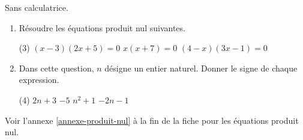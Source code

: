 \documentclass[10pt,a4paper]{article}
\begin{document}
\begin{bloc}
\begin{exo}
Sans calculatrice.
\begin{enumerate}[leftmargin=*]
    \item Résoudre les équations produit nul suivantes.
    \begin{tasks}(3)
        \task \((x-3)(2x+5)=0\)
        \task \(x(x+7)=0\)
        \task \((4-x)(3x-1)=0\)
    \end{tasks}
    \item Dans cette question, \(n\) désigne un entier naturel. Donner le signe de chaque expression.
    \begin{tasks}(4)
        \task \(2n+3\)
        \task \(-5\)
        \task \(n^2+1\)
        \task \(-2n-1\)
    \end{tasks}
\end{enumerate}
\end{exo}

\begin{indication}
    Voir l'annexe \ref{annexe-produit-nul} à la fin de la fiche pour les équations produit nul.
\end{indication}
\end{bloc}
\end{document}
